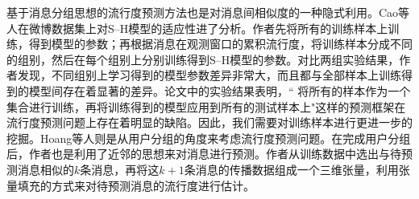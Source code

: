 基于消息分组思想的流行度预测方法也是对消息间相似度的一种隐式利用。Cao等人\citep{cao2017predicting}在微博数据集上对S--H模型\citep{szabo2010predicting}的适应性进了分析。作者先将所有的训练样本上训练，得到模型的参数；再根据消息在观测窗口的累积流行度，将训练样本分成不同的组别，然后在每个组别上分别训练得到S--H模型的参数。对比两组实验结果，作者发现，不同组别上学习得到的模型参数差异非常大，而且都与全部样本上训练得到的模型间存在着显著的差异。论文中的实验结果表明，`` 将所有的样本作为一个集合进行训练，再将训练得到的模型应用到所有的测试样本上"这样的预测框架在流行度预测问题上存在着明显的缺陷。因此，我们需要对训练样本进行更进一步的挖掘。Hoang等人\citep{hoang2017gpop}则是从用户分组的角度来考虑流行度预测问题。在完成用户分组后，作者也是利用了近邻的思想来对消息进行预测。作者从训练数据中选出与待预测消息相似的$k$条消息，再将这$k+1$条消息的传播数据组成一个三维张量，利用张量填充的方式来对待预测消息的流行度进行估计。
%
%
